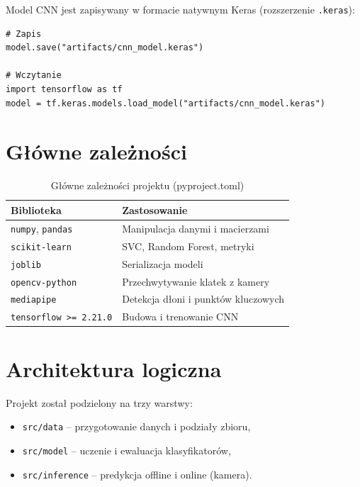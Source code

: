 Model CNN jest zapisywany w formacie natywnym Keras (rozszerzenie \texttt{.keras}):

\begin{lstlisting}[style=stylePython, caption={Zapis i odczyt modelu CNN (Keras)}, label=lst:keras]
# Zapis
model.save("artifacts/cnn_model.keras")

# Wczytanie
import tensorflow as tf
model = tf.keras.models.load_model("artifacts/cnn_model.keras")
\end{lstlisting}

\section{Główne zależności}

\begin{table}[H]
    \centering
    \caption{Główne zależności projektu (pyproject.toml)}
    \label{tab:deps}
    \begin{tabular}{ll}
        \toprule
        \textbf{Biblioteka} & \textbf{Zastosowanie} \\
        \midrule
        \texttt{numpy}, \texttt{pandas}   & Manipulacja danymi i macierzami \\
        \texttt{scikit-learn}             & SVC, Random Forest, metryki \\
        \texttt{joblib}                   & Serializacja modeli \\
        \texttt{opencv-python}            & Przechwytywanie klatek z kamery \\
        \texttt{mediapipe}                & Detekcja dłoni i punktów kluczowych \\
        \texttt{tensorflow >= 2.21.0}     & Budowa i trenowanie CNN \\
        \bottomrule
    \end{tabular}
\end{table}

\section{Architektura logiczna}
\label{sec:architektura_logiczna}

Projekt został podzielony na trzy warstwy:
\begin{itemize}
    \item \texttt{src/data} -- przygotowanie danych i podziały zbioru,
    \item \texttt{src/model} -- uczenie i ewaluacja klasyfikatorów,
    \item \texttt{src/inference} -- predykcja offline i online (kamera).
\end{itemize}


